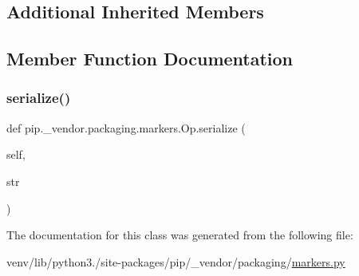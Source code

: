 \subsection*{Additional Inherited Members}


\subsection{Member Function Documentation}
\mbox{\label{classpip_1_1__vendor_1_1packaging_1_1markers_1_1Op_a608f07b1c1a4f75ff238ac4c490e35e8}} 
\subsubsection{\texorpdfstring{serialize()}{serialize()}}
{\footnotesize\ttfamily def pip.\+\_\+vendor.\+packaging.\+markers.\+Op.\+serialize (\begin{DoxyParamCaption}\item[{}]{self,  }\item[{}]{str }\end{DoxyParamCaption})}



The documentation for this class was generated from the following file\+:\begin{DoxyCompactItemize}
\item 
venv/lib/python3./site-\/packages/pip/\+\_\+vendor/packaging/\hyperlink{pip_2__vendor_2packaging_2markers_8py}{markers.\+py}\end{DoxyCompactItemize}
